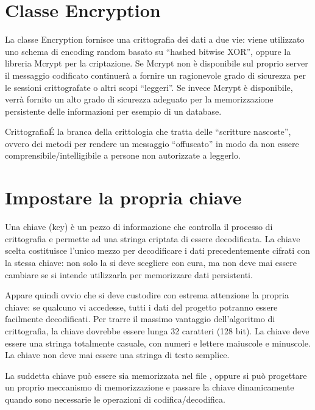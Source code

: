 \section{Classe Encryption}
\label{class:encryption}

La classe Encryption fornisce una crittografia dei dati a due vie: viene utilizzato uno schema di encoding random basato su ``hashed bitwise XOR'', oppure la libreria Mcrypt per la criptazione. Se Mcrypt non è disponibile sul proprio server il messaggio codificato continuerà a fornire un ragionevole grado di sicurezza per le sessioni crittografate o altri scopi ``leggeri''. Se invece Mcrypt è disponibile, verrà fornito un alto grado di sicurezza adeguato per la memorizzazione persistente delle informazioni per esempio di un database.

\begin{deftab}{Crittografia}{\'E la branca della crittologia che tratta delle ``scritture nascoste'', ovvero dei metodi per rendere un messaggio ``offuscato'' in modo da non essere comprensibile/intelligibile a persone non autorizzate a leggerlo.}
\end{deftab}

\section*{Impostare la propria chiave}
Una chiave (key) è un pezzo di informazione che controlla il processo di crittografia e permette ad una stringa criptata di essere decodificata. La chiave scelta costituisce l'unico mezzo per decodificare i dati precedentemente cifrati con la stessa chiave: non solo la si deve scegliere con cura, ma non deve mai essere cambiare se si intende utilizzarla per memorizzare dati persistenti.

Appare quindi ovvio che si deve custodire con estrema attenzione la propria chiave: se qualcuno vi accedesse, tutti i dati del progetto potranno essere facilmente decodificati. Per trarre il massimo vantaggio dell'algoritmo di crittografia, la chiave dovrebbe essere lunga 32 caratteri (128 bit). La chiave deve essere una stringa totalmente casuale, con numeri e lettere maiuscole e minuscole. La chiave non deve mai essere una stringa di testo semplice.

La suddetta chiave può essere sia memorizzata nel file , oppure si può progettare un proprio meccanismo di memorizzazione e passare la chiave dinamicamente quando sono necessarie le operazioni di codifica/decodifica.

